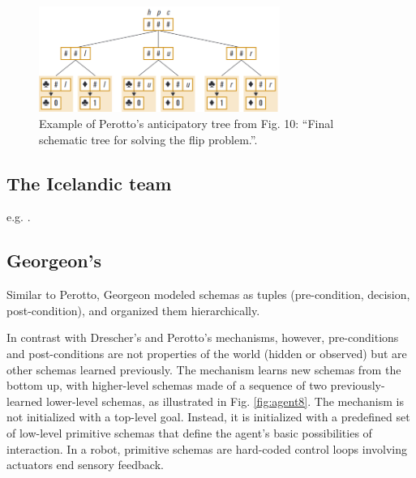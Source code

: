 \documentclass[runningheads]{llncs}
\begin{document}
\begin{figure}
	\centering
	\includegraphics[width=0.7\textwidth]{Figure_perotto_tree.png}
	\caption{Example of Perotto's anticipatory tree from \cite{perotto_computational_nodate} Fig. 10: ``Final schematic tree for solving the flip problem.''.
 } 
	\label{fig:perotto_tree}
\end{figure}



\subsection{The Icelandic team}

e.g. \cite{thorisson_seed-programmed_2020}.

\subsection{Georgeon's}

Similar to Perotto, Georgeon modeled schemas as tuples (pre-condition, decision, post-condition), and organized them  hierarchically. 

In contrast with Drescher's and Perotto's mechanisms, however, pre-conditions and post-conditions are not properties of the world (hidden or observed) but are other schemas learned previously. 
The mechanism learns new schemas from the bottom up, with higher-level schemas made of a sequence of two previously-learned lower-level schemas, 
as illustrated in Fig. \ref{fig:agent8}. 
The mechanism is not initialized with a top-level goal. 
Instead, it is initialized with a predefined set of low-level primitive schemas that define the agent's basic possibilities of interaction. 
In a robot, primitive schemas are hard-coded control loops involving actuators end sensory feedback. 
\end{document}
